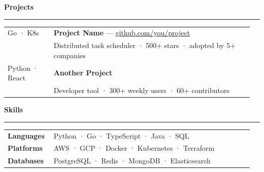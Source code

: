 \documentclass[a4paper]{article}
\begin{document}
\begin{minipage}{\dimexpr\textwidth-40pt}
\vspace{10pt}
{\color{accentblue}\large\textbf{Projects}}\\[-2pt]
{\color{accentblue}\rule{\linewidth}{0.5pt}}

\vspace{6pt}
\noindent\begin{tabular}{@{}p{0.18\linewidth}p{0.78\linewidth}}
{\footnotesize\color{gray} Go · K8s} &
\textbf{Project Name} — \href{https://github.com/you/project}{\footnotesize github.com/you/project} \\
& \footnotesize Distributed task scheduler · 500+ stars · adopted by 5+ companies \\[4pt]
{\footnotesize\color{gray} Python · React} &
\textbf{Another Project} \\
& \footnotesize Developer tool · 300+ weekly users · 60+ contributors \\
\end{tabular}

\vspace{10pt}
{\color{accentblue}\large\textbf{Skills}}\\[-2pt]
{\color{accentblue}\rule{\linewidth}{0.5pt}}

\vspace{6pt}
\noindent\begin{tabular}{@{}p{0.18\linewidth}p{0.78\linewidth}}
\textbf{Languages}  & Python · Go · TypeScript · Java · SQL \\[2pt]
\textbf{Platforms}  & AWS · GCP · Docker · Kubernetes · Terraform \\[2pt]
\textbf{Databases}  & PostgreSQL · Redis · MongoDB · Elasticsearch \\
\end{tabular}

\end{minipage}
\end{document}
